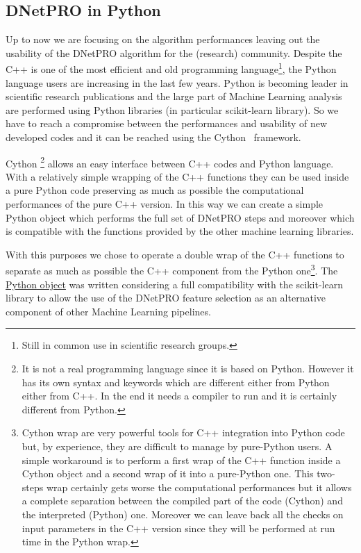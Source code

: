\documentclass{standalone}
\begin{document}
\subsection[Python wrap]{DNetPRO in Python}\label{implementation:python}

Up to now we are focusing on the algorithm performances leaving out the usability of the DNetPRO algorithm for the (research) community.
Despite the \textsf{C++} is one of the most efficient and old programming language\footnote{
  Still in common use in scientific research groups.
}, the \textsf{Python} language users are increasing in the last few years.
\textsf{Python} is becoming leader in scientific research publications and the large part of Machine Learning analysis are performed using \textsf{Python} libraries (in particular \textsf{scikit-learn} library).
So we have to reach a compromise between the performances and usability of new developed codes and it can be reached using the \textsf{Cython}~\cite{behnel2010cython} framework.

Cython \footnote{
  It is not a real programming language since it is based on \textsf{Python}.
  However it has its own syntax and keywords which are different either from \textsf{Python} either from \textsf{C++}.
  In the end it needs a compiler to run and it is certainly different from \textsf{Python}.
} allows an easy interface between \textsf{C++} codes and \textsf{Python} language.
With a relatively simple wrapping of the \textsf{C++} functions they can be used inside a pure \textsf{Python} code preserving as much as possible the computational performances of the pure \textsf{C++} version.
In this way we can create a simple \textsf{Python} object which performs the full set of DNetPRO steps and moreover which is compatible with the functions provided by the other machine learning libraries.

With this purposes we chose to operate a double wrap of the \textsf{C++} functions to separate as much as possible the \textsf{C++} component from the \textsf{Python} one\footnote{
  Cython wrap are very powerful tools for \textsf{C++} integration into \textsf{Python} code but, by experience, they are difficult to manage by pure-\textsf{Python} users.
  A simple workaround is to perform a first wrap of the \textsf{C++} function inside a Cython object and a second wrap of it into a pure-\textsf{Python} one.
  This two-steps wrap certainly gets worse the computational performances but it allows a complete separation between the compiled part of the code (\textsf{Cython}) and the interpreted (\textsf{Python}) one.
  Moreover we can leave back all the checks on input parameters
  in the \textsf{C++} version since they will be performed at run time in the Python wrap.
}.
The \href{https://github.com/Nico-Curti/DNetPRO/blob/master/DNetPRO/DNetPRO.py}{\textsf{Python} object} was written considering a full compatibility with the \textsf{scikit-learn} library to allow the use of the DNetPRO feature selection as an alternative component of other Machine Learning pipelines.
\end{document}
